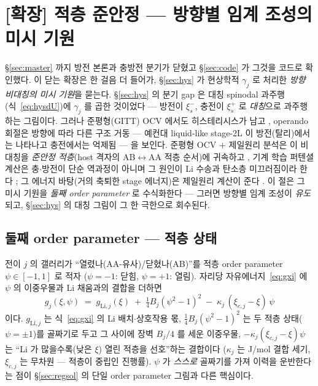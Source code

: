 \documentclass[11pt,a4paper]{article}
\begin{document}
\section{[확장] 적층 준안정 — 방향별 임계 조성의 미시 기원}\label{sec:stacking}
\S\ref{sec:master} 까지 방전 본론과 충방전 분기가 닫혔고 \S\ref{sec:code} 가 그것을 코드로 확인했다.
이 닫는 확장은 한 걸음 더 들어가, \S\ref{sec:hys} 가 현상학적 $\gamma_j$ 로 처리한 \emph{방향 비대칭의
미시 기원}을 묻는다. \S\ref{sec:hys} 의 분기 gap 은 대칭 spinodal 과주행(식~\eqref{eq:hysdU})에
$\gamma_j$ 를 곱한 것이었다 — 방전이 $\xi_s^-$, 충전이 $\xi_s^+$ 로 \emph{대칭}으로 과주행하는
그림이다. 그러나 준평형(GITT) OCV 에서도 히스테리시스가 남고 \cite{mercer2021,allart2018}, operando
회절은 방향에 따라 다른 구조 거동 — 예컨대 liquid-like stage-2L 이 방전(탈리)에서는 나타나고 충전에서는
억제됨 \cite{didier2020,schmitt2022} — 을 보인다. 준평형 OCV $+$ 제일원리 분석은 이 비대칭을 \emph{준안정
적층}(host 격자의 AB$\leftrightarrow$AA 적층 순서)에 귀속하고 \cite{mercer2021}, 기계 학습 퍼텐셜
계산은 충$\cdot$방전이 단순 역과정이 아니며 그 원인이 Li 수송과 탄소층 미끄러짐이라 한다 \cite{wang2025};
그 에너지 바탕(거의 축퇴한 stage 에너지)은 제일원리 계산이 준다 \cite{persson2010}. 이 절은 그 미시
기원을 \emph{둘째 order parameter} 로 수식화한다 — 그러면 방향별 임계 조성이 \emph{유도}되고,
\S\ref{sec:hys} 의 대칭 그림이 그 한 극한으로 회수된다.

\subsection{둘째 order parameter — 적층 상태}
전이 $j$ 의 갤러리가 ``열렸나(AA-유사)/닫혔나(AB)''를 적층 order parameter $\psi\in[-1,1]$ 로 적자
($\psi=-1$: 닫힘, $\psi=+1$: 열림). 자리당 자유에너지~\eqref{eq:gxi} 에 $\psi$ 의 이중우물과 Li
채움과의 결합을 더하면
\begin{equation}
g_j(\xi,\psi)\;=\;g_{\mathrm{Li},j}(\xi)
\;+\;\tfrac14 B_j(\psi^2-1)^2
\;-\;\kappa_j\,(\xi_{c,j}-\xi)\,\psi
\label{eq:gcoupled}
\end{equation}
이다. $g_{\mathrm{Li},j}$ 는 식~\eqref{eq:gxi} 의 Li 배치$\cdot$상호작용 몫, $\tfrac14 B_j(\psi^2-1)^2$
는 두 적층 상태($\psi=\pm1$)를 골짜기로 두고 그 사이에 장벽 $B_j/4$ 를 세운 이중우물,
$-\kappa_j(\xi_{c,j}-\xi)\psi$ 는 ``Li 가 많을수록(낮은 $\xi$) 열린 적층을 선호''하는 결합이다
($\kappa_j$ 는 J/mol 결합 세기, $\xi_{c,j}$ 는 무차원 — 적층이 중립인 진행률). $\psi$ 가
\emph{스스로} 골짜기를 가져 이력을 운반한다는 점이 \S\ref{sec:regsol} 의 단일 order parameter 그림과
다른 핵심이다.
\end{document}
